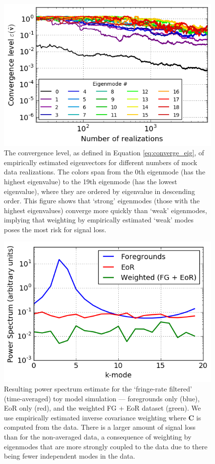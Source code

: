 \documentclass[preprint2,numberedappendix,tighten]{aastex6}  %
\begin{document}
\begin{figure}
	\centering
	\includegraphics[width=\columnwidth]{plots/toy_sigloss17.png}
	\caption{The convergence level, as defined in Equation \eqref{eq:converge_eig}, of empirically estimated eigenvectors for different numbers of mock data realizations. The colors span from the 0th eigenmode (has the highest eigenvalue) to the 19th eigenmode (has the lowest eigenvalue), where they are ordered by eigenvalue in descending order. This figure shows that `strong' eigenmodes (those with the highest eigenvalues) converge more quickly than `weak' eigenmodes, implying that weighting by empirically estimated `weak' modes poses the most risk for signal loss.}
	\label{fig:toy_sigloss17}
\end{figure}

\begin{figure}
	\centering
	\includegraphics[trim={0cm 0cm 0cm 0cm},clip,width=\columnwidth]{plots/toy_sigloss7.png}
	\caption{Resulting power spectrum estimate for the `fringe-rate filtered' (time-averaged) toy model simulation --- foregrounds only (blue), 
EoR only (red), and the weighted FG + EoR dataset (green). We use empirically estimated inverse covariance weighting where $\textbf{C}$ is 
computed from the data. There is a larger amount of signal loss than for the non-averaged data, a consequence of weighting by eigenmodes that are more strongly coupled to the data due to there being fewer independent modes in the data.}
	\label{fig:toy_sigloss7}
\end{figure}
\end{document}

